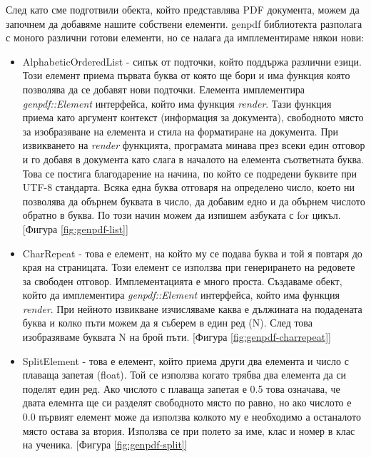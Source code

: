 След като сме подготвили обекта, който представлява PDF документа, можем да
започнем да добавяме нашите собствени елементи. genpdf библиотекта разполага
с моного различни готови елементи, но се налага да имплементираме някои нови:
\begin{itemize}
    \item AlphabeticOrderedList - сипък от подточки, който поддържа различни езици.
        Този елемент приема първата буква от която ще бори и има функция която позволява
        да се добавят нови подточки. Елемента имплементира \textit{genpdf::Element} интерфейса,
        който има функция \textit{render}. Тази функция приема като аргумент контекст
        (информация за документа), свободното място за изобразяване на елемента
        и стила на форматиране на документа. При извикването на \textit{render}
        функцията, програмата минава през всеки един отговор и го добавя в
        документа като слага в началото на елемента съответната буква.
        Това се постига благодарение на начина, по който се подредени буквите при UTF-8
        стандарта. Всяка една буква отговаря на определено число, което ни позволява да
        обърнем буквата в число, да добавим едно и да обърнем числото обратно в буква.
        По този начин можем да изпишем азбуката с for цикъл.
        [Фигура \ref{fig:genpdf-list}]

    \item CharRepeat - това е елемент, на който му се подава буква и той я
        повтаря до края на страницата. Този елемент се използва при
        генерирането на редовете за свободен отговор. Имплементацията е много
        проста. Създаваме обект, който да имплементира \textit{genpdf::Element}
        интерфейса, който има функция \textit{render}. При нейното извикване изчисляваме
        каква е дължината на подадената буква и колко пъти можем да я съберем в един
        ред (N). След това изобразяваме буквата N на брой пъти.
        [Фигура \ref{fig:genpdf-charrepeat}]

    \item SplitElement - това е елемент, който приема други два елемента и
        число с плаваща запетая (float). Той се използва когато трябва два
        елемента да си поделят един ред. Ако числото с плаваща запетая е 0.5
        това означава, че двата елемнта ще си разделят свободното място по
        равно, но ако числото е 0.0 първият елемент може да използва колкото му
        е необходимо а останалото място остава за втория. Използва се при
        полето за име, клас и номер в клас на ученика.
        [Фигура \ref{fig:genpdf-split}]
\end{itemize}

